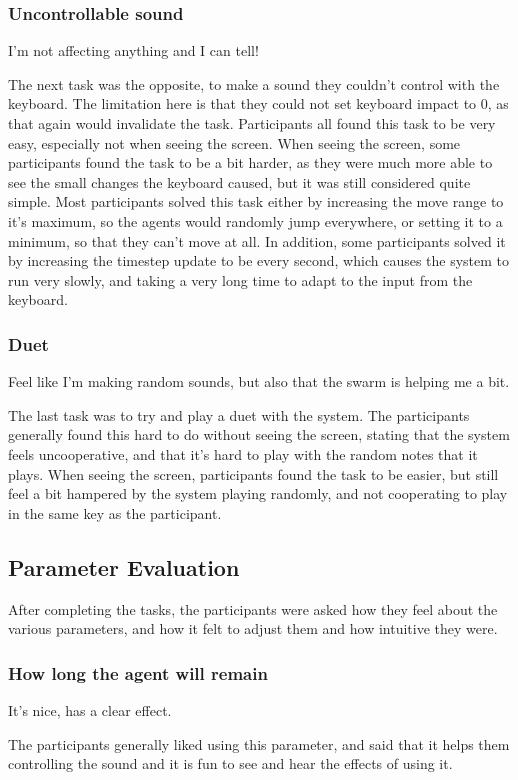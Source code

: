 \documentclass[a4paper,english]{report}
\begin{document}
	\subsubsection{Uncontrollable sound}
	\begin{displayquote}
		I'm not affecting anything and I can tell!
	\end{displayquote}
	The next task was the opposite, to make a sound they couldn't control with the keyboard. The limitation here is that they could not set keyboard impact to 0, as that again would invalidate the task. Participants all found this task to be very easy, especially not when seeing the screen. When seeing the screen, some participants found the task to be a bit harder, as they were much more able to see the small changes the keyboard caused, but it was still considered quite simple. Most participants solved this task either by increasing the move range to it's maximum, so the agents would randomly jump everywhere, or setting it to a minimum, so that they can't move at all. In addition, some participants solved it by increasing the timestep update to be every second, which causes the system to run very slowly, and taking a very long time to adapt to the input from the keyboard.
	\subsubsection{Duet}
	\begin{displayquote}
		Feel like I'm making random sounds, but also that the swarm is helping me a bit.
	\end{displayquote}
	The last task was to try and play a duet with the system. The participants generally found this hard to do without seeing the screen, stating that the system feels uncooperative, and that it's hard to play with the random notes that it plays. When seeing the screen, participants found the task to be easier, but still feel a bit hampered by the system playing randomly, and not cooperating to play in the same key as the participant.
	
	\subsection{Parameter Evaluation}
	After completing the tasks, the participants were asked how they feel about the various parameters, and how it felt to adjust them and how intuitive they were.
	\subsubsection{How long the agent will remain}
	\begin{displayquote}
		It's nice, has a clear effect.
	\end{displayquote}
	The participants generally liked using this parameter, and said that it helps them controlling the sound and it is fun to see and hear the effects of using it.
\end{document}
